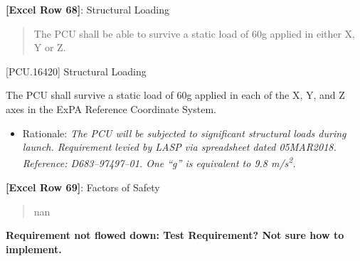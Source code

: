 \textbf{[Excel Row 68]}: Structural Loading

\begin{quote}
The PCU shall be able to survive a static load of 60g applied in either X, Y or Z.
\end{quote}

[PCU.16420] Structural Loading

The PCU shall survive a static load of 60g applied in each of the X, Y, and Z axes in the ExPA Reference Coordinate System.

\begin{itemize}
\item{} Rationale: \emph{The PCU will be subjected to significant structural loads during launch. Requirement levied by LASP via spreadsheet dated 05MAR2018. Reference: D683--97497--01. One ``g'' is equivalent to 9.8 m\slash s\textsuperscript{2}.}

\end{itemize}

\textbf{[Excel Row 69]}: Factors of Safety

\begin{quote}
nan
\end{quote}

\textbf{Requirement not flowed down: Test Requirement? Not sure how to implement.}




